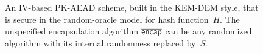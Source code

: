 \begin{figure}
\begin{center}

\medskip
\hspace*{.5ex} 
\caption{An IV-based PK-AEAD scheme, built in the KEM-DEM style, that is secure in the random-oracle model for hash function~$H$. The unspecified encapsulation algorithm $\overline{\mathsf{encap}}$ can be any randomized algorithm with its internal randomness replaced by~$\overline{S}$.
}
\label{fig:ro-kem-dem-construction}
\end{center}
\end{figure}
